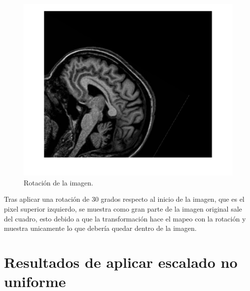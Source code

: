 \documentclass[11pt, letterpaper]{article}
\begin{document}
\begin{figure}[h!]
	\centering
	\begin{minipage}{0.8\textwidth}
		\centering
		\includegraphics[width=\textwidth]{IMG/R2.jpg}
		\caption{Rotación de la imagen.}
		\label{fig:f8}
	\end{minipage}\hfill
\end{figure}

Tras aplicar una rotación de 30 grados respecto al inicio de la imagen, que es el pixel superior izquierdo, se muestra como gran parte de la imagen original sale del cuadro, esto debido a que la transformación hace el mapeo con la rotación y muestra unicamente lo que debería quedar dentro de la imagen.

\newpage

\section{Resultados de aplicar escalado no uniforme}
\end{document}
